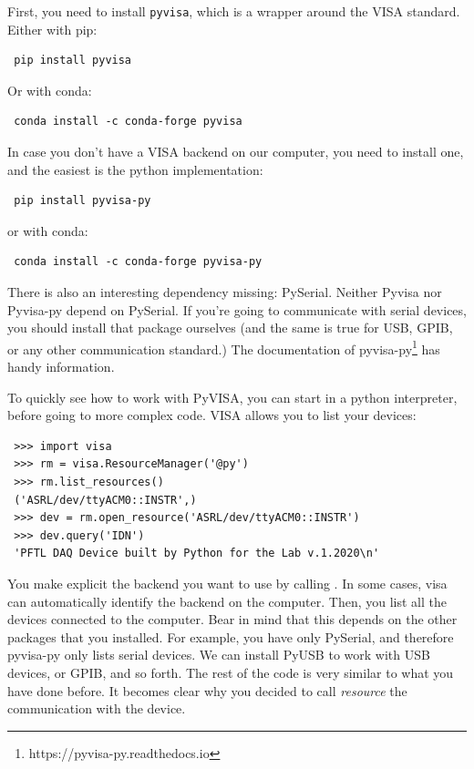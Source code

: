 First, you need to install \texttt{pyvisa}, which is a wrapper around the VISA standard. Either with pip:

\begin{verbatim}
 pip install pyvisa
\end{verbatim}

Or with conda:

\begin{verbatim}
 conda install -c conda-forge pyvisa
\end{verbatim}

In case you don't have a VISA backend on our computer, you need to install one, and the easiest is the python implementation:

\begin{verbatim}
 pip install pyvisa-py
\end{verbatim}

or with conda:

\begin{verbatim}
 conda install -c conda-forge pyvisa-py
\end{verbatim}

There is also an interesting dependency missing: PySerial. Neither Pyvisa nor Pyvisa-py depend on PySerial. If you're going to communicate with serial devices, you should install that package ourselves (and the same is true for USB, GPIB, or any other communication standard.) The documentation of pyvisa-py\footnote{https://pyvisa-py.readthedocs.io} has handy information.

To quickly see how to work with PyVISA, you can start in a python interpreter, before going to more complex code. VISA allows you to list your devices:

\begin{verbatim}
 >>> import visa
 >>> rm = visa.ResourceManager('@py')
 >>> rm.list_resources()
 ('ASRL/dev/ttyACM0::INSTR',)
 >>> dev = rm.open_resource('ASRL/dev/ttyACM0::INSTR')
 >>> dev.query('IDN')
 'PFTL DAQ Device built by Python for the Lab v.1.2020\n'
\end{verbatim}

\sloppy You make explicit the backend you want to use by calling . In some cases, visa can automatically identify the backend on the computer. Then, you list all the devices connected to the computer. Bear in mind that this depends on the other packages that you installed. For example, you have only PySerial, and therefore pyvisa-py only lists serial devices. We can install PyUSB to work with USB devices, or GPIB, and so forth. The rest of the code is very similar to what you have done before. It becomes clear why you decided to call \emph{resource} the communication with the device.

